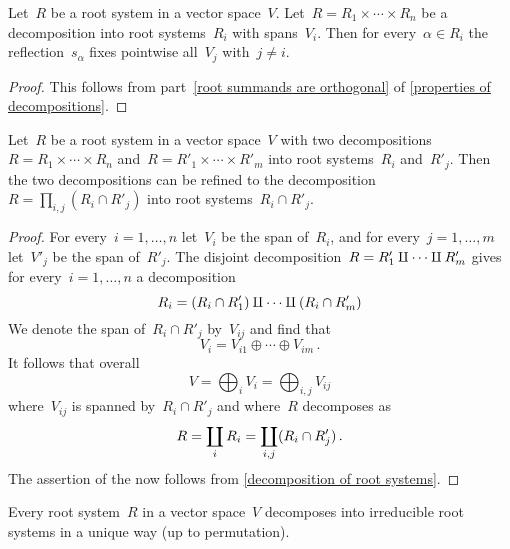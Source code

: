 \begin{corollary}
  \label{reflection fixes other summands}
  Let~$R$ be a root system in a vector space~$V$.
  Let~$R = R_1 \times \dotsb \times R_n$ be a decomposition into root systems~$R_i$ with spans~$V_i$.
  Then for every~$\alpha \in R_i$ the reflection~$s_\alpha$ fixes pointwise all~$V_j$ with~$j \neq i$.
\end{corollary}


\begin{proof}
  This follows from part~\ref*{root summands are orthogonal} of \cref{properties of decompositions}.
\end{proof}


\begin{lemma}
  \label{common refinement of root system decomposition}
  Let~$R$ be a root system in a vector space~$V$ with two decompositions~$R = R_1 \times \dotsb \times R_n$ and~$R = R'_1 \times \dotsb \times R'_m$ into root systems~$R_i$ and~$R'_j$.
  Then the two decompositions can be refined to the decomposition~$R = \prod_{i,j} (R_i \cap R'_j)$ into root systems~$R_i \cap R'_j$.
\end{lemma}


\begin{proof}
  For every~$i = 1, \dotsc, n$ let~$V_i$ be the span of~$R_i$, and for every~$j = 1, \dotsc, m$ let~$V'_j$ be the span of~$R'_j$.
  The disjoint decomposition~$R = R'_1 \amalg \dotsb \amalg R'_m$ gives for every~$i = 1, \dotsc, n$ a decomposition
  \[
    R_i
    =
    (R_i \cap R'_1) \amalg \dotsb \amalg (R_i \cap R'_m)
  \]
  We denote the span of~$R_i \cap R'_j$ by~$V_{ij}$ and find that
  \[
    V_i
    =
    V_{i1} \oplus \dotsb \oplus V_{im} \,.
  \]
  It follows that overall
  \[
    V
    =
    \bigoplus_i V_i
    =
    \bigoplus_{i,j} V_{ij}
  \]
  where~$V_{ij}$ is spanned by~$R_i \cap R'_j$ and where~$R$ decomposes as
  \[
    R
    =
    \coprod_i R_i
    =
    \coprod_{i,j} (R_i \cap R'_j) \,.
  \]
  The assertion of the  now follows from \cref{decomposition of root systems}.
\end{proof}


\begin{corollary}
  \label{irreducible decomposition of root systems}
  Every root system~$R$ in a vector space~$V$ decomposes into irreducible root systems in a unique way (up to permutation).
\end{corollary}


